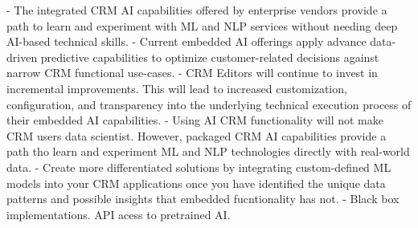     - The integrated CRM AI capabilities offered by enterprise vendors provide a path to learn and experiment with ML and NLP services without needing deep AI-based technical skills.
    - Current embedded AI offerings apply advance data-driven predictive capabilities to optimize customer-related decisions against narrow CRM functional use-cases.
    - CRM Editors will continue to invest in incremental improvements. This will lead to increased customization, configuration, and transparency into the underlying technical execution process of their embedded AI capabilities.
    - Using AI CRM functionality will not make CRM users data scientist. However, packaged CRM AI capabilities provide a path tho learn and experiment ML and NLP technologies directly with real-world data.
    - Create more differentiated solutions by integrating custom-defined ML models into your CRM applications once you have identified the unique data patterns and possible insights that embedded fucntionality has not.
    - Black box implementations. API acess to pretrained AI.
    
